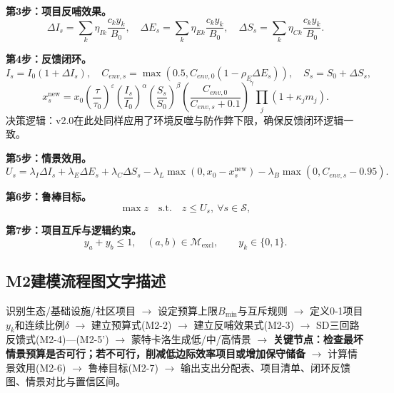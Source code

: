 \documentclass[UTF8,a4paper,12pt]{ctexart}
\begin{document}
\textbf{第3步：项目反哺效果。}
\begin{equation}\tag{M2-3}
\Delta I_s=\sum_k\eta_{Ik}\frac{c_ky_k}{B_0},\quad
\Delta E_s=\sum_k\eta_{Ek}\frac{c_ky_k}{B_0},\quad
\Delta S_s=\sum_k\eta_{Ck}\frac{c_ky_k}{B_0}.
\end{equation}

\textbf{第4步：反馈闭环。}
\begin{equation}\tag{M2-4}
I_s=I_0(1+\Delta I_s),\quad
C_{env,s}=\max(0.5, C_{env,0}(1-\rho_E\Delta E_s)),\quad
S_s=S_0+\Delta S_s,
\end{equation}
\begin{equation}\tag{M2-5'}
x_s^{\mathrm{new}}=x_0\left(\frac{\tau}{\tau_0}\right)^\varepsilon
\left(\frac{I_s}{I_0}\right)^\alpha
\left(\frac{S_s}{S_0}\right)^\beta
\left(\frac{C_{env,0}}{C_{env,s} + 0.1}\right)^\gamma
\prod_j(1+\kappa_jm_j).
\end{equation}
决策逻辑：v2.0在此处同样应用了环境反噬与防作弊下限，确保反馈闭环逻辑一致。

\textbf{第5步：情景效用。}
\begin{equation}\tag{M2-6}
U_s=\lambda_I\Delta I_s+\lambda_E\Delta E_s+\lambda_C\Delta S_s
-\lambda_L\max(0,x_0-x_s^{\mathrm{new}})
-\lambda_B\max(0,C_{env,s}-0.95).
\end{equation}

\textbf{第6步：鲁棒目标。}
\begin{equation}\tag{M2-7}
\max z \quad \text{s.t.}\quad z\le U_s,\ \forall s\in\mathcal S,
\end{equation}

\textbf{第7步：项目互斥与逻辑约束。}
\begin{equation}\tag{M2-9}
y_a+y_b\le1,\quad (a,b)\in\mathcal M_{\mathrm{excl}},\qquad y_k\in\{0,1\}.
\end{equation}

\subsection{M2建模流程图文字描述}

识别生态/基础设施/社区项目 \(\rightarrow\) 设定预算上限\(B_{\min}\)与互斥规则 \(\rightarrow\) 定义0-1项目\(y_k\)和连续比例\(\delta\) \(\rightarrow\) 建立预算式(M2-2) \(\rightarrow\) 建立反哺效果式(M2-3) \(\rightarrow\) SD三回路反馈式(M2-4)—(M2-5') \(\rightarrow\) 蒙特卡洛生成低/中/高情景 \(\rightarrow\) \textbf{关键节点：检查最坏情景预算是否可行；若不可行，削减低边际效率项目或增加保守储备} \(\rightarrow\) 计算情景效用(M2-6) \(\rightarrow\) 鲁棒目标(M2-7) \(\rightarrow\) 输出支出分配表、项目清单、闭环反馈图、情景对比与置信区间。
\end{document}
